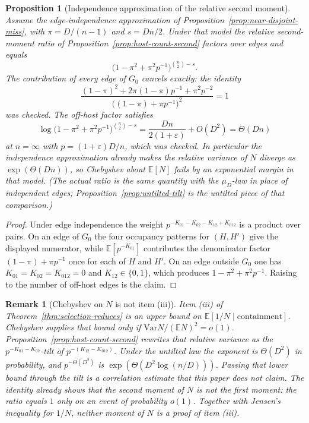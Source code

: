 \documentclass[11pt]{article}
\newtheorem{proposition}[theorem]{Proposition}
\newtheorem{remark}[theorem]{Remark}
\newcommand{\EE}{\mathbb{E}}
\newcommand{\Var}{\mathrm{Var}}
\begin{document}
\begin{proposition}[Independence approximation of the relative second moment]
\label{prop:indep-rv-closed}
Assume the edge-independence approximation of
Proposition~\ref{prop:near-disjoint-miss}, with \(\pi=D/(n-1)\) and
\(s=Dn/2\).
Under that model the relative second-moment ratio of
Proposition~\ref{prop:host-count-second} factors over edges and equals
\[
\bigl(1-\pi^2+\pi^2 p^{-1}\bigr)^{\binom{n}{2}-s}.
\]
The contribution of every edge of \(G_0\) cancels exactly: the identity
\[
\frac{(1-\pi)^2+2\pi(1-\pi)p^{-1}+\pi^2 p^{-2}}
{\bigl((1-\pi)+\pi p^{-1}\bigr)^2}
=
1
\]
was checked.
The off-host factor satisfies
\[
\log\bigl(1-\pi^2+\pi^2 p^{-1}\bigr)^{\binom{n}{2}-s}
=
\frac{Dn}{2(1+\varepsilon)}+O(D^2)
=
\Theta(Dn)
\]
at \(n=\infty\) with \(p=(1+\varepsilon)D/n\), which was checked.
In particular the independence approximation already makes the relative
variance of \(N\) diverge as \(\exp(\Theta(Dn))\), so Chebyshev about
\(\EE[N]\) fails by an exponential margin in that model.
(The actual ratio is the same quantity with the \(\mu_D\)-law in place of
independent edges; Proposition~\ref{prop:untilted-tilt} is the untilted
piece of that comparison.)
\end{proposition}

\begin{proof}
Under edge independence the weight
\(p^{-K_{01}-K_{02}-K_{12}+K_{012}}\) is a product over pairs.
On an edge of \(G_0\) the four occupancy patterns for \((H,H')\) give the
displayed numerator, while \(\EE[p^{-K_{01}}]\) contributes the denominator
factor \((1-\pi)+\pi p^{-1}\) once for each of \(H\) and \(H'\).
On an edge outside \(G_0\) one has \(K_{01}=K_{02}=K_{012}=0\) and
\(K_{12}\in\{0,1\}\), which produces \(1-\pi^2+\pi^2 p^{-1}\).
Raising to the number of off-host edges is the claim.
\end{proof}

\begin{remark}[Chebyshev on \(N\) is not item (iii)]
\label{rem:host-chebyshev}
Item (iii) of Theorem~\ref{thm:selection-reduces} is an upper bound on
\(\EE[1/N\mid\text{containment}]\).
Chebyshev supplies that bound only if \(\Var N/(\EE N)^2=o(1)\).
Proposition~\ref{prop:host-count-second} rewrites that relative variance as
the \(p^{-K_{01}-K_{02}}\)-tilt of \(p^{-(K_{12}-K_{012})}\).
Under the untilted law the exponent is \(\Theta(D^2)\) in probability, and
\(p^{-\Theta(D^2)}\) is \(\exp(\Theta(D^2\log(n/D)))\).
Passing that lower bound through the tilt is a correlation estimate that this
paper does not claim.
The identity already shows that the second moment of \(N\) is not the first
moment: the ratio equals \(1\) only on an event of probability \(o(1)\).
Together with Jensen's inequality for \(1/N\), neither moment of \(N\) is a
proof of item (iii).
\end{remark}
\end{document}
